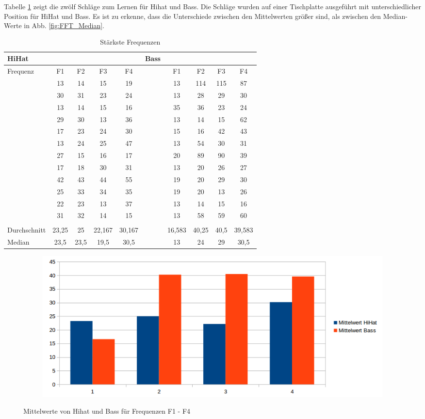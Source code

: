 Tabelle \ref{tab:FFT} zeigt die zwölf Schläge zum Lernen für Hihat und Bass.
Die Schläge wurden auf einer Tischplatte ausgeführt mit unterschiedlicher Position für HiHat und Bass.
Es ist zu erkenne, dass die Unterschiede zwischen den Mittelwerten größer sind, als zwischen den Median-Werte in Abb. \ref{fig:FFT_Median}.

\begin{table}[H]
	\centering
	\caption{Stärkste Frequenzen}
	\begin{tabular}{l c c c c | l c c c c}
		HiHat &&&& &Bass \\
		\hline
		Frequenz & F1 & F2 & F3 & F4  & & F1 & F2 & F3 & F4\\	
		& 13 & 14 & 15 & 19  &&13& 114& 115& 87\\
		& 30 & 31 & 23 & 24 &&13& 28& 29& 30\\
		& 13& 14& 15& 16 &&35& 36& 23& 24\\
		& 29& 30& 13&36 &&13& 14& 15& 62\\
		& 17& 23&24& 30 	&&15& 16& 42& 43\\
		&13& 24& 25& 47	&&13& 54& 30& 31\\

		&27& 15& 16& 17	&&20& 89& 90& 39\\

		 &17& 18& 30& 31 &&13& 20& 26& 27\\

		&42& 43& 44& 55		&&19& 20& 29& 30\\

		 &25& 33& 34& 35 &&19& 20& 13& 26 \\

		&22& 23& 13& 37		&&13& 14& 15& 16\\

		&31& 32& 14& 15  &&13& 58& 59& 60\\
		\\
		\hline
		Durchschnitt & 23,25&	25	&22,167& 30,167 && 16,583	&40,25&	40,5&	39,583	\\
		Median & 23,5 &	23,5& 19,5	& 30,5 && 13 &	24	& 29	 &30,5 \\		 
		

	\end{tabular}
	\label{tab:FFT}
\end{table}

\begin{figure}[H]
\centering
\begin{subfigure}{.5\textwidth}
		\includegraphics[scale=0.5]{figures/Mittelwert_hihatbass.png}
\end{subfigure}
\caption{Mittelwerte von Hihat und Bass für Frequenzen F1 - F4}
\label{fig:FFT_Mittelwerte}
\end{figure}


